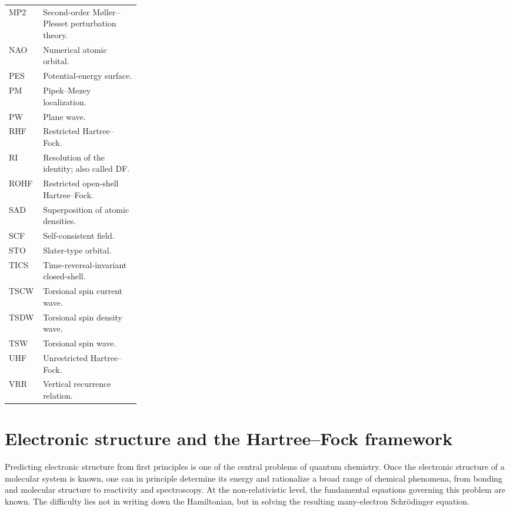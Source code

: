 \documentclass[11pt,a4paper,titlepage]{article}
\numberwithin{equation}{section}
\begin{document}
\begin{longtable}{@{}p{0.26\linewidth}p{}@{}}
  MP2 & Second-order M{\o}ller--Plesset perturbation theory.\\
  NAO & Numerical atomic orbital.\\
  PES & Potential-energy surface.\\
  PM & Pipek--Mezey localization.\\
  PW & Plane wave.\\
  RHF & Restricted Hartree--Fock.\\
  RI & Resolution of the identity; also called DF.\\
  ROHF & Restricted open-shell Hartree--Fock.\\
  SAD & Superposition of atomic densities.\\
  SCF & Self-consistent field.\\
  STO & Slater-type orbital.\\
  TICS & Time-reversal-invariant closed-shell.\\
  TSCW & Torsional spin current wave.\\
  TSDW & Torsional spin density wave.\\
  TSW & Torsional spin wave.\\
  UHF & Unrestricted Hartree--Fock.\\
  VRR & Vertical recurrence relation.\\
\end{longtable}
\endgroup

\clearpage
{}


\section{Electronic structure and the Hartree--Fock framework}
\label{sec:hf-framework}

Predicting electronic structure from first principles is one of the central
problems of quantum chemistry. Once the electronic structure of a molecular
system is known, one can in principle determine its energy and rationalize a
broad range of chemical phenomena, from bonding and molecular structure to
reactivity and spectroscopy. At the non-relativistic level, the fundamental
equations governing this problem are known. The difficulty lies not in writing
down the Hamiltonian, but in solving the resulting many-electron
Schr\"odinger equation.
\end{document}
